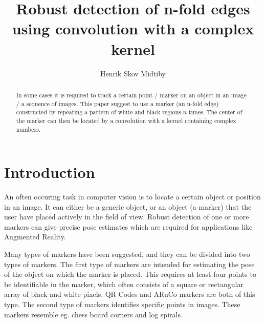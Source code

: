 \documentclass{article}
\title{Robust detection of n-fold edges using convolution with a complex kernel}
\author{Henrik Skov Midtiby}
\begin{document}
 
\maketitle 
\begin{abstract} 
In some cases it is required to track a certain point / marker on an object in an image / a sequence of images. 
This paper suggest to use a marker (an n-fold edge) constructed by repeating a 
pattern of white and black regions $n$ times. 
The center of the marker can then be located by a convolution with a kernel containing complex numbers. 
\end{abstract} 
\section{Introduction} 
An often occuring task in computer vision is to locate a certain object or position in an image. 
It can either be a generic object, or an object (a marker) that the user have placed actively in the field of view. 
Robust detection of one or more markers can give precise pose estimates which are required for applications like Augmented Reality. 
 
Many types of markers have been suggested, and they can be divided into two types of markers. 
The first type of markers are intended for estimating the pose of the object on which the marker is placed. 
This requires at least four points to be identifiable in the marker, which often consists of a square or rectangular 
array of black and white pixels. 
QR Codes and ARuCo markers are both of this type. 
The second type of markers identifies specific points in images. 
These markers resemble eg. chess board corners and log spirals. 
 
\end{document}
